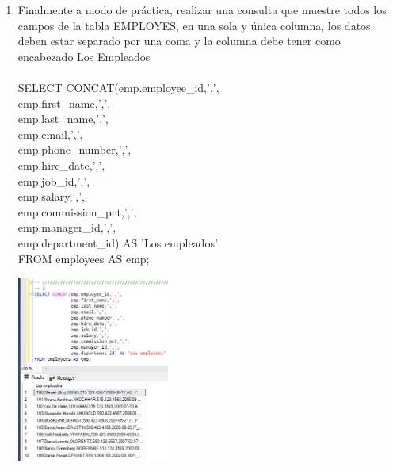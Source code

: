 \begin{enumerate}[1.]
	\item  Finalmente a modo de práctica, realizar una consulta que muestre todos los campos de la tabla EMPLOYES, en una sola y única columna, los datos deben estar separado por una coma y la columna debe tener como encabezado Los Empleados
	\\
	\\SELECT CONCAT(emp.employee\_id,',', \\
			  emp.first\_name,',', \\
			  emp.last\_name,',', \\
			  emp.email,',', \\
			  emp.phone\_number,',', \\
			  emp.hire\_date,',', \\
			  emp.job\_id,',', \\
			  emp.salary,',', \\
			  emp.commission\_pct,',', \\
			  emp.manager\_id,',', \\
			  emp.department\_id) AS 'Los empleados' \\
	FROM employees AS emp; \\
	\begin{center}
	\includegraphics[width=5cm]{./Imagenes/actividad0303} 
	\end{center}

\end{enumerate}



